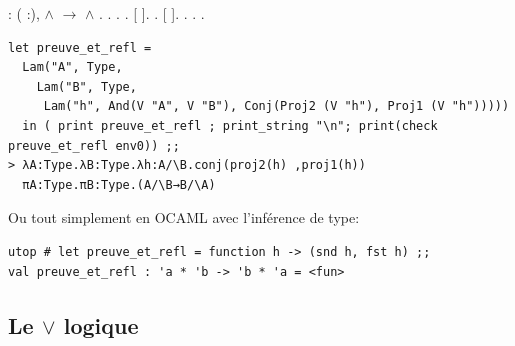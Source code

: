 \documentclass[11pt]{book}
\begin{document}
\begin{coqdoccode}
\coqdocnoindent
{} : \coqdockw{\ensuremath{\forall}} ( :), \ensuremath{\land} \ensuremath{\rightarrow} \ensuremath{\land} .\coqdoceol
\coqdocnoindent
{}.\coqdoceol
\coqdocindent{0.50em}
   .\coqdoceol
\coqdocindent{0.50em}
.\coqdoceol
\coqdocindent{0.50em}
   [  ].\coqdoceol
\coqdocindent{0.50em}
.\coqdoceol
\coqdocindent{0.50em}
   [ ].\coqdoceol
\coqdocindent{0.50em}
.\coqdoceol
\coqdocnoindent
{}.\coqdoceol
\coqdocemptyline
\coqdocnoindent
{} .\coqdoceol
\coqdocemptyline
\end{coqdoccode}

\begin{Verbatim}
let preuve_et_refl = 
  Lam("A", Type,
    Lam("B", Type, 
     Lam("h", And(V "A", V "B"), Conj(Proj2 (V "h"), Proj1 (V "h"))))) 
  in ( print preuve_et_refl ; print_string "\n"; print(check preuve_et_refl env0)) ;;
> λA:Type.λB:Type.λh:A/\B.conj(proj2(h) ,proj1(h))
  πA:Type.πB:Type.(A/\B→B/\A)
\end{Verbatim}
Ou tout simplement en OCAML avec l'inférence de type:
\begin{Verbatim}
utop # let preuve_et_refl = function h -> (snd h, fst h) ;;
val preuve_et_refl : 'a * 'b -> 'b * 'a = <fun>
\end{Verbatim}

\subsection{Le $\lor$ logique}
\end{document}
